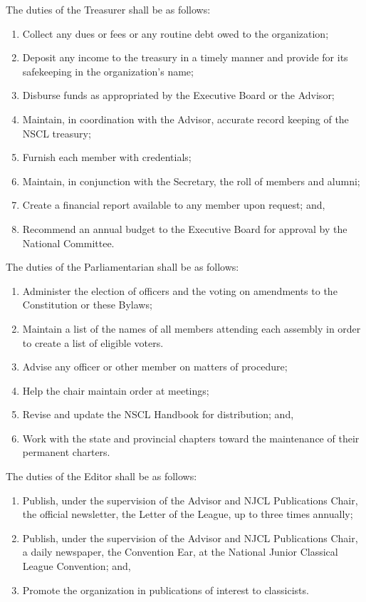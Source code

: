 \documentclass{bylaws}
\newcommand{\NSCL}{\textsc{NSCL}\xspace}
\newcommand{\NJCL}{\textsc{NJCL}\xspace}
\begin{document}
\begin{linenumbers}[1]
\begin{enumerate}
    \sub[Treasurer] The duties of the Treasurer shall be as follows:
    \begin{enumerate}
    \item Collect any dues or fees or any routine debt owed to the
      organization;
    \item Deposit any income to the treasury in a timely manner and
      provide for its safekeeping in the organization's name;
    \item Disburse funds as appropriated by the Executive Board or the
      Advisor;
    \item Maintain, in coordination with the Advisor, accurate record
      keeping of the \NSCL treasury;
    \item Furnish each member with credentials;
    \item Maintain, in conjunction with the Secretary, the roll of
      members and alumni;
    \item Create a financial report available to any member upon
      request; and,
    \item Recommend an annual budget to the Executive Board for approval
      by the National Committee.
    \end{enumerate}
    \pagebreak
    \sub[Parliamentarian] The duties of the Parliamentarian shall be as
    follows:
    \begin{enumerate}
    \item Administer the election of officers and the voting on
      amendments to the Constitution or these Bylaws;
    \item Maintain a list of the names of all members attending each
      assembly in order to create a list of eligible voters.
    \item Advise any officer or other member on matters of procedure;
    \item Help the chair maintain order at meetings;
    \item Revise and update the \NSCL Handbook for distribution; and,
    \item Work with the state and provincial chapters toward the
      maintenance of their permanent charters.
    \end{enumerate}
    
    \sub[Editor] The duties of the Editor shall be as follows:
    \begin{enumerate}
    \item Publish, under the supervision of the Advisor and \NJCL
      Publications Chair, the official newsletter, the Letter of the
      League, up to three times annually;
    \item Publish, under the supervision of the Advisor and \NJCL
      Publications Chair, a daily newspaper, the Convention Ear, at the
      National Junior Classical League Convention; and,
    \item Promote the organization in publications of interest to
      classicists.
    \end{enumerate}
    

\end{enumerate}
\end{linenumbers}
\end{document}
